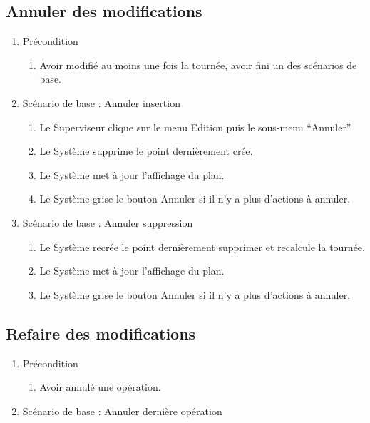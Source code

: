 \subsection{Annuler des modifications}
\begin{enumerate}
\item Précondition
\begin{enumerate}
\item Avoir modifié au moins une fois la tournée, avoir fini un des scénarios de base.
\end{enumerate}


\item Scénario de base : Annuler insertion
\begin{enumerate}
\item Le Superviseur clique sur le menu Edition puis le sous-menu “Annuler”.
\item Le Système supprime le point dernièrement crée.
\item Le Système met à jour l’affichage du plan.
\item Le Système grise le bouton Annuler si il n’y a plus d’actions à annuler.


\end{enumerate}
\item Scénario de base : Annuler suppression
\begin{enumerate}
\item Le Système recrée le point dernièrement supprimer et recalcule la tournée.
\item Le Système met à jour l’affichage du plan.
\item Le Système grise le bouton Annuler si il n’y a plus d’actions à annuler.
\end{enumerate}
\end{enumerate}




\subsection{Refaire des modifications}
\begin{enumerate}
\item Précondition
\begin{enumerate}
\item Avoir annulé une opération.
\end{enumerate}


\item Scénario de base : Annuler dernière opération

\end{enumerate}
